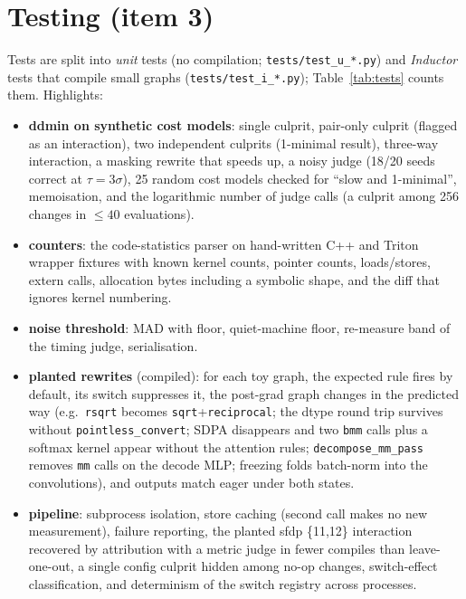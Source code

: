 \documentclass[11pt]{article}
\newcommand{\code}[1]{\texttt{#1}}
\begin{document}
\section{Testing (item 3)}
Tests are split into \emph{unit} tests (no compilation; \code{tests/test\_u\_*.py}) and
\emph{Inductor} tests that compile small graphs (\code{tests/test\_i\_*.py}); Table~\ref{tab:tests}
counts them. Highlights:
\begin{itemize}
\item \textbf{ddmin on synthetic cost models}: single culprit, pair-only culprit (flagged as an
  interaction), two independent culprits (1-minimal result), three-way interaction, a masking
  rewrite that speeds up, a noisy judge (18/20 seeds correct at $\tau = 3\sigma$), 25 random cost
  models checked for ``slow and 1-minimal'', memoisation, and the logarithmic number of judge calls
  (a culprit among 256 changes in $\le 40$ evaluations).
\item \textbf{counters}: the code-statistics parser on hand-written C++ and Triton wrapper fixtures
  with known kernel counts, pointer counts, loads/stores, extern calls, allocation bytes including
  a symbolic shape, and the diff that ignores kernel numbering.
\item \textbf{noise threshold}: MAD with floor, quiet-machine floor, re-measure band of the timing
  judge, serialisation.
\item \textbf{planted rewrites} (compiled): for each toy graph, the expected rule fires by default,
  its switch suppresses it, the post-grad graph changes in the predicted way (e.g.\ \code{rsqrt}
  becomes \code{sqrt}+\code{reciprocal}; the dtype round trip survives without
  \code{pointless\_convert}; SDPA disappears and two \code{bmm} calls plus a softmax kernel appear
  without the attention rules; \code{decompose\_mm\_pass} removes \code{mm} calls on the decode MLP;
  freezing folds batch-norm into the convolutions), and outputs match eager under both states.
\item \textbf{pipeline}: subprocess isolation, store caching (second call makes no new measurement),
  failure reporting, the planted sfdp \{11,12\} interaction recovered by attribution with a metric
  judge in fewer compiles than leave-one-out, a single config culprit hidden among no-op changes,
  switch-effect classification, and determinism of the switch registry across processes.
\end{itemize}


\end{document}
